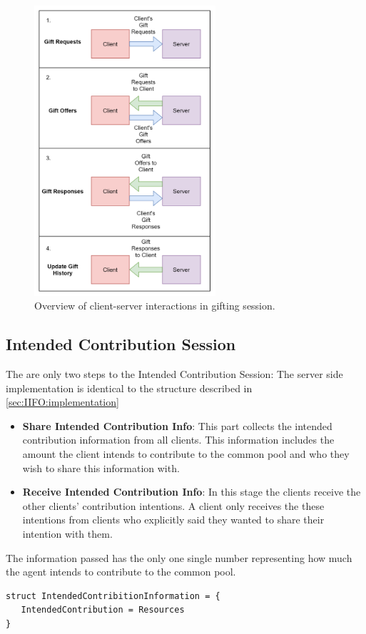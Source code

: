 \begin{figure}[!htb]
    \centering
    \includegraphics[width=0.6\textwidth]{06_iito/images/gifting_diagram.png}
    \caption{Overview of client-server interactions in gifting session.}
    \label{fig:IITO:gifting_session_diagram}
\end{figure}

\subsection{Intended Contribution Session}
\label{subsec:IITO:intended_contribution_session}
The are only two steps to the Intended Contribution Session: The server side implementation is identical to the structure described in \ref{sec:IIFO:implementation}
\begin{itemize}
    \item \textbf{Share Intended Contribution Info}: This part collects the intended contribution information from all clients. This information includes the amount the client intends to contribute to the common pool and who they wish to share this information with.
    \item \textbf{Receive Intended Contribution Info}: In this stage the clients receive the other clients' contribution intentions. A client only receives the these intentions from clients who explicitly said they wanted to share their intention with them.
\end{itemize}
The information passed has the only one single number representing how much the agent intends to contribute to the common pool. 
\begin{verbatim}
struct IntendedContribitionInformation = {
   IntendedContribution = Resources
}
\end{verbatim}
